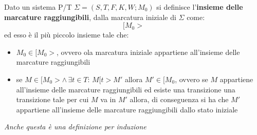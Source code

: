 \documentclass[a4paper,12pt, oneside]{book}
\begin{document}
\begin{definizione}
  Dato un sistema P/T $\Sigma=(S, T , F , K , W;M_0)$ si definisce
  l'\textbf{insieme delle marcature raggiungibili}, dalla marcatura iniziale  di
  $\Sigma$ come:
  \[[M_0>\]
  ed esso è il più piccolo insieme tale che:
  \begin{itemize}
    \item $M_0\in [M_0>$, ovvero ola marcatura iniziale appartiene all'insieme
    delle marcature raggiungibili
    \item se $M\in [M_0> \wedge\,\exists t\in T:\,M[t>M'$ allora $M'\in [M_0$,
    ovvero se $M$ appartiene all'insieme delle marcature raggiungibili ed esiste
    una transizione una transizione tale per cui $M$ va in $M'$ allora, di
    conseguenza si ha che $M'$ appartiene all'insieme delle marcature
    raggiungibili dallo stato iniziale
  \end{itemize}
  \emph{Anche questa è una definizione per induzione}
\end{definizione}
\end{document}
